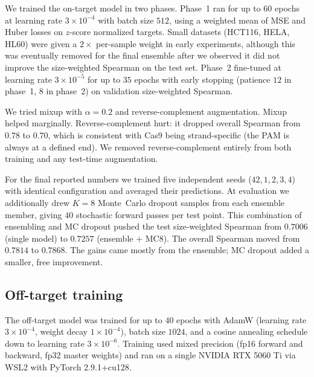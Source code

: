 \documentclass[11pt,a4paper]{article}
\begin{document}
We trained the on-target model in two phases. Phase~1 ran for up to $60$ epochs at learning rate $3\!\times\!10^{-4}$ with batch size $512$, using a weighted mean of MSE and Huber losses on $z$-score normalized targets. Small datasets (HCT116, HELA, HL60) were given a $2\times$ per-sample weight in early experiments, although this was eventually removed for the final ensemble after we observed it did not improve the size-weighted Spearman on the test set. Phase~2 fine-tuned at learning rate $3\!\times\!10^{-5}$ for up to $35$ epochs with early stopping (patience $12$ in phase~1, $8$ in phase~2) on validation size-weighted Spearman.

We tried mixup with $\alpha{=}0.2$ and reverse-complement augmentation. Mixup helped marginally. Reverse-complement hurt: it dropped overall Spearman from $0.78$ to $0.70$, which is consistent with Cas9 being strand-specific (the PAM is always at a defined end). We removed reverse-complement entirely from both training and any test-time augmentation.

For the final reported numbers we trained five independent seeds ($42, 1, 2, 3, 4$) with identical configuration and averaged their predictions. At evaluation we additionally drew $K{=}8$ Monte~Carlo dropout samples from each ensemble member, giving $40$ stochastic forward passes per test point. This combination of ensembling and MC dropout pushed the test size-weighted Spearman from $0.7006$ (single model) to $0.7257$ (ensemble + MC8). The overall Spearman moved from $0.7814$ to $0.7868$. The gains came mostly from the ensemble; MC dropout added a smaller, free improvement.

\subsection{Off-target training}
\label{subsec:off_training}

The off-target model was trained for up to $40$ epochs with AdamW (learning rate $3\!\times\!10^{-4}$, weight decay $1\!\times\!10^{-4}$), batch size $1024$, and a cosine annealing schedule down to learning rate $3\!\times\!10^{-6}$. Training used mixed precision (fp16 forward and backward, fp32 master weights) and ran on a single NVIDIA RTX 5060 Ti via WSL2 with PyTorch 2.9.1+cu128.
\end{document}
